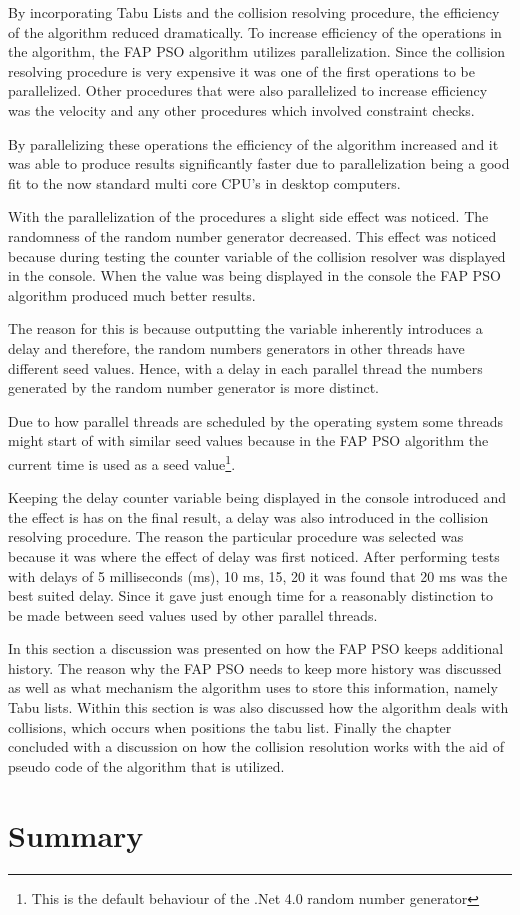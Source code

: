 By incorporating Tabu Lists and the collision resolving procedure, the efficiency of the algorithm reduced dramatically. To increase efficiency of the operations in the algorithm, the FAP PSO algorithm utilizes parallelization. Since the collision resolving procedure is very expensive it was one of the first operations to be parallelized. Other procedures that were also parallelized to increase efficiency was the velocity and any other procedures which involved constraint checks.

By parallelizing these operations the efficiency of the algorithm increased and it was able to produce results significantly faster due to parallelization being a good fit to the now standard multi core CPU's in desktop computers.

With the parallelization of the procedures a slight side effect was noticed. The randomness of the random number generator decreased. This effect was noticed because during testing the counter variable of the collision resolver was displayed in the console. When the value was being displayed in the console the FAP PSO algorithm produced much better results. 

The reason for this is because outputting the variable inherently introduces a delay and therefore, the random numbers generators in other threads have different seed values. Hence, with a delay in each parallel thread the numbers generated by the random number generator is more distinct. 

Due to how parallel threads are scheduled by the operating system some threads might start of with similar seed values because in  the FAP PSO algorithm the current time is used as a seed value\footnote{This is the default behaviour of the .Net 4.0 random number generator}.

Keeping the delay counter variable being displayed in the console introduced and the effect is has on the final result, a delay was also introduced in the collision resolving procedure. The reason the particular procedure was selected was because it was where the effect of delay was first noticed. After performing tests with delays of 5 milliseconds (ms), 10 ms, 15, 20 it was found that 20 ms was the best suited delay. Since it gave just enough time for a reasonably distinction to be made between seed values used by other parallel threads.

In this section a discussion was presented on how the FAP PSO keeps additional history. The reason why the FAP PSO needs to keep more history was discussed as well as what mechanism the algorithm uses to store this information, namely Tabu lists. Within this section is was also discussed how the algorithm deals with collisions, which occurs when positions the tabu list. Finally the chapter concluded with a discussion on how the collision resolution works with the aid of pseudo code of the algorithm that is utilized.

\section{Summary}
